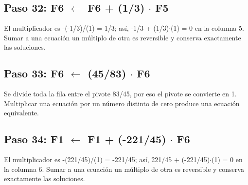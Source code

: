 \documentclass[conference]{IEEEtran}
\begin{document}
\medskip
\subsection*{Paso 32: F6 \(\leftarrow\) F6 + (1/3) \(\cdot\) F5}
El multiplicador es -(-1/3)/(1) = 1/3; así, -1/3 + (1/3)\(\cdot\)(1) = 0 en la columna 5. Sumar a una ecuación un múltiplo de otra es reversible y conserva exactamente las soluciones.


\medskip
\subsection*{Paso 33: F6 \(\leftarrow\) (45/83) \(\cdot\) F6}
Se divide toda la fila entre el pivote 83/45, por eso el pivote se convierte en 1. Multiplicar una ecuación por un número distinto de cero produce una ecuación equivalente.


\medskip
\subsection*{Paso 34: F1 \(\leftarrow\) F1 + (-221/45) \(\cdot\) F6}
El multiplicador es -(221/45)/(1) = -221/45; así, 221/45 + (-221/45)\(\cdot\)(1) = 0 en la columna 6. Sumar a una ecuación un múltiplo de otra es reversible y conserva exactamente las soluciones.
\end{document}
